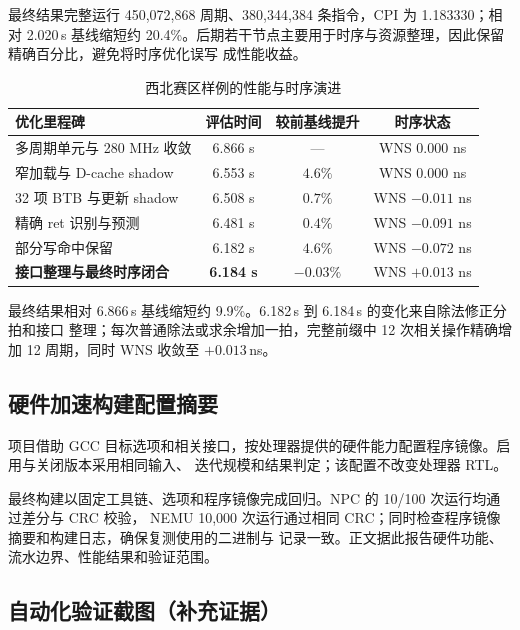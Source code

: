最终结果完整运行 450,072,868 周期、380,344,384 条指令，CPI 为 1.183330；相对 2.020\,s
基线缩短约 20.4\%。后期若干节点主要用于时序与资源整理，因此保留精确百分比，避免将时序优化误写
成性能收益。

\begin{table}[H]
  \centering
  \caption{西北赛区样例的性能与时序演进}
  \small
  \setlength{\tabcolsep}{5pt}
  \begin{tabular}{@{}lccc@{}}
    \toprule
    优化里程碑 & 评估时间 & 较前基线提升 & 时序状态 \\
    \midrule
    多周期单元与 280 MHz 收敛 & 6.866 s & --- & WNS $0.000$ ns \\
    窄加载与 D-cache shadow & 6.553 s & $4.6\%$ & WNS $0.000$ ns \\
    32 项 BTB 与更新 shadow & 6.508 s & $0.7\%$ & WNS $-0.011$ ns \\
    精确 ret 识别与预测 & 6.481 s & $0.4\%$ & WNS $-0.091$ ns \\
    部分写命中保留 & 6.182 s & $4.6\%$ & WNS $-0.072$ ns \\
    \textbf{接口整理与最终时序闭合} & \textbf{6.184 s} & $-0.03\%$ & WNS $+0.013$ ns \\
    \bottomrule
  \end{tabular}
\end{table}

最终结果相对 6.866\,s 基线缩短约 9.9\%。6.182\,s 到 6.184\,s 的变化来自除法修正分拍和接口
整理；每次普通除法或求余增加一拍，完整前缀中 12 次相关操作精确增加 12 周期，同时 WNS 收敛至
$+0.013$\,ns。



\subsection{硬件加速构建配置摘要}\label{app:accel-build}

项目借助 GCC 目标选项和相关接口，按处理器提供的硬件能力配置程序镜像。启用与关闭版本采用相同输入、
迭代规模和结果判定；该配置不改变处理器 RTL。

最终构建以固定工具链、选项和程序镜像完成回归。NPC 的 10/100 次运行均通过差分与 CRC 校验，
NEMU 10,000 次运行通过相同 CRC；同时检查程序镜像摘要和构建日志，确保复测使用的二进制与
记录一致。正文据此报告硬件功能、流水边界、性能结果和验证范围。
\subsection{自动化验证截图（补充证据）}

